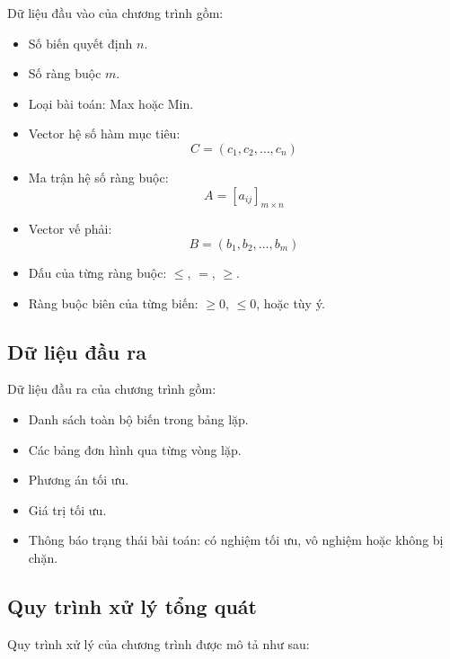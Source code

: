 \documentclass[14pt, a4paper]{extarticle}
\begin{document}
    Dữ liệu đầu vào của chương trình gồm:
    
    \begin{itemize}
        \item Số biến quyết định $n$.
        \item Số ràng buộc $m$.
        \item Loại bài toán: Max hoặc Min.
        \item Vector hệ số hàm mục tiêu:
        \[
        C = (c_1, c_2, \ldots, c_n)
        \]
        \item Ma trận hệ số ràng buộc:
        \[
        A = [a_{ij}]_{m \times n}
        \]
        \item Vector vế phải:
        \[
        B = (b_1, b_2, \ldots, b_m)
        \]
        \item Dấu của từng ràng buộc: $\leq$, $=$, $\geq$.
        \item Ràng buộc biên của từng biến: $\geq 0$, $\leq 0$, hoặc tùy ý.
    \end{itemize}
    
    \subsection{Dữ liệu đầu ra}
    
    Dữ liệu đầu ra của chương trình gồm:
    
    \begin{itemize}
        \item Danh sách toàn bộ biến trong bảng lặp.
        \item Các bảng đơn hình qua từng vòng lặp.
        \item Phương án tối ưu.
        \item Giá trị tối ưu.
        \item Thông báo trạng thái bài toán: có nghiệm tối ưu, vô nghiệm hoặc không bị chặn.
    \end{itemize}
    
    \subsection{Quy trình xử lý tổng quát}
    
    Quy trình xử lý của chương trình được mô tả như sau:
    
\end{document}
